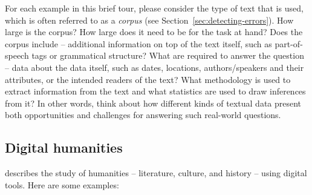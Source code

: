 
For each example in this brief tour, please consider the type of text
that is used, which is often referred to as a \emph{corpus} (see
Section~\ref{sec:detecting-errors}).  How large is the corpus? How
large does it need to be for the task at hand?  Does the corpus include  -- additional information on top of the text itself, such as part-of-speech tags or grammatical structure?  What  are required to answer the question -- data about the data itself, such as dates, locations, 
authors/speakers and their attributes, or the intended readers of the
text?  What methodology is used to extract information from the text
and what statistics are used to draw inferences from it? In other
words, think about how different kinds of textual data present both
opportunities and challenges for answering such real-world questions.

\subsection{Digital humanities}

 describes the study of humanities --
literature, culture, and history -- using digital tools.  Here are
some examples:

